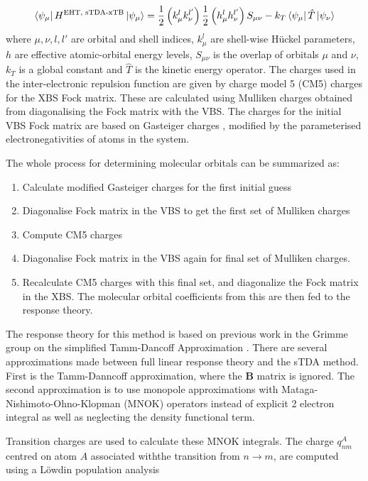 \begin{equation}
\bra{\psi_\mu} H^{\text{EHT, sTDA-xTB}} \ket{\psi_\mu}= \frac{1}{2} \left(k^l_\mu k^{l'}_\nu\right) \frac{1}{2} \left(h^l_\mu h^{l'}_\nu\right) S_{\mu\nu} - k_T \bra{\psi_\mu}\hat{T}\ket{\psi_\nu}
\end{equation}
%
where $\mu,\nu,l,l'$ are orbital and shell indices, $k^l_\mu$ are shell-wise 
H{\"u}ckel parameters, $h$ are effective atomic-orbital energy levels, $S_{\mu\nu}$
is the overlap of orbitals $\mu$ and $\nu$, $k_T$ is a global constant and $\hat{T}$
is the kinetic energy operator. The charges used in the inter-electronic repulsion 
function are given by charge model 5 (CM5) \cite{Marenich2012} charges for the XBS
Fock matrix. These are calculated using Mulliken charges obtained from diagonalising
the Fock matrix with the VBS. The charges for the initial VBS Fock matrix are based
on Gasteiger charges \cite{Gasteiger1978}, modified by the parameterised
electronegativities of atoms in the system.

The whole process for determining molecular orbitals can be summarized as:
\begin{enumerate}
	\item Calculate modified Gasteiger charges for the first initial guess
	\item Diagonalise Fock matrix in the VBS to get the first set of Mulliken charges
	\item Compute CM5 charges
	\item Diagonalise Fock matrix in the VBS again for final set of Mulliken charges.
	\item Recalculate CM5 charges with this final set, and diagonalize the Fock matrix in the XBS. The molecular orbital coefficients from this are then fed to the response theory.
\end{enumerate}

The response theory for this method is based on previous work in the Grimme 
group on the simplified Tamm-Dancoff Approximation \cite{Grimme2013}.
There are several approximations made between full linear response theory and
the sTDA method. First is the Tamm-Danncoff approximation, where the $\mathbf{B}$
matrix is ignored. The second approximation is to use monopole approximations with
Mataga-Nishimoto-Ohno-Klopman (MNOK) operators instead of explicit 2 electron integral
as well as neglecting the density functional term.

Transition charges are used to calculate these MNOK integrals. The charge $q^A_{nm}$
centred on atom $A$ associated withthe transition from $ n \rightarrow m$, are
computed using a Löwdin population analysis

